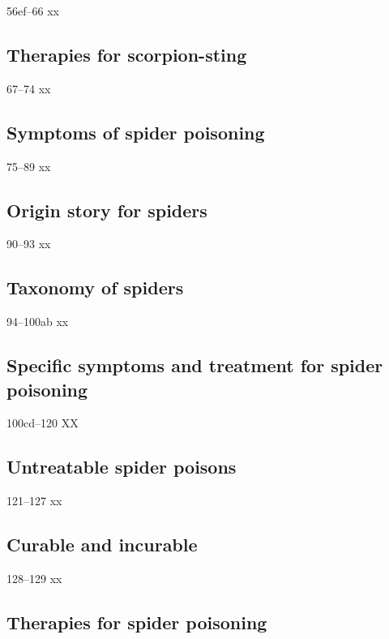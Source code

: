 \begin{translation}
 
 \item [56ef--66] xx
 
 \subsection{Therapies for scorpion-sting}
 
 \item[67--74] xx
 
 \subsection{Symptoms of spider poisoning}
 
 \item[75--89] xx
 
 \subsection{Origin story for spiders}
 
 \item[90--93] xx
 
 \subsection{Taxonomy of spiders}
 
 \item[94--100ab] xx
 
 \subsection{Specific symptoms and treatment for spider poisoning}
 
 \item[100cd--120] XX
 
 \subsection{Untreatable spider poisons}
 
 \item [121--127] xx
 
 \subsection{Curable and incurable}
 
 \item[128--129] xx
 
 \subsection{Therapies for spider poisoning}
 

\end{translation}

